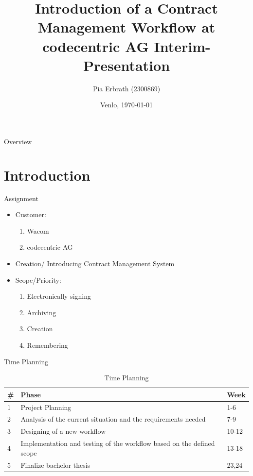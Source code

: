 \documentclass[utf8, xcolor, usenames,dvipsnames, aspectratio=169]{beamer}
\title
  [Contract Management Workflow]
  {Introduction of a Contract Management Workflow at codecentric AG \newline Interim-Presentation}
\author
  [Pia Erbrath]
  {Pia Erbrath (2300869)}
\date
  {Venlo, \today}
\institute
  {FHTenL Venlo}
\begin{document}
\maketitle

\begin{frame}{Overview}

  \tableofcontents

\end{frame}

\section{Introduction}
\begin{frame}{Assignment}
	\begin{itemize}
		\item Customer:
		\begin{enumerate}
			\item Wacom
			\item codecentric AG
		\end{enumerate}
		\item Creation/ Introducing Contract Management System
		\item Scope/Priority:
		\begin{enumerate}
			\item Electronically signing
			\item Archiving
			\item Creation
			\item Remembering
		\end{enumerate}
	\end{itemize}
\end{frame}

\begin{frame}{Time Planning}
	\begin{table}
		\begin{tabular}{|p{0.5cm}|p{9cm}|p{1.5cm}|} \hline
			\textbf{\#} & \textbf{Phase} & \textbf{Week} \\ \hline
			1 & Project Planning & 1-6\\ \hline
			\color{BlueGreen} 2 & \color{BlueGreen} Analysis of the current situation and the requirements needed & \color{BlueGreen} 7-9\\  \hline
			3 & Designing of a new workflow & 10-12 \\ \hline
			4 & Implementation and testing of the workflow based on the defined scope & 13-18 \\ \hline
			5 & Finalize bachelor thesis & 23,24 \\ \hline
		\end{tabular}
		\caption{Time Planning}
	\end{table}
\end{frame}
\end{document}
